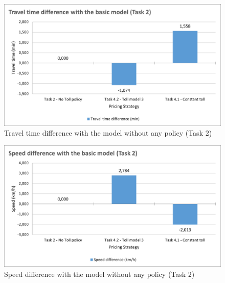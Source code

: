 \documentclass[a4paper, 12pt,oneside]{article}
\begin{document}
\begin{minipage}[c]{0.5\textwidth}
\begin{figure}[H]
    \centering
    \includegraphics[width=1\textwidth]{Images/Step4/TravelTime.png}
    \caption{Travel time difference with the model without any policy (Task 2)}
    \label{fig:Travel time difference with the model without any policy (Task 2)}
\end{figure}
\end{minipage}
\begin{minipage}[c]{0.5\textwidth}
\begin{figure}[H]
    \centering
    \includegraphics[width=1\textwidth]{Images/Step4/Speed.png}
    \caption{Speed difference with the model without any policy (Task 2)}
    \label{fig:Speed difference with the model without any policy (Task 2)}
\end{figure}
\end{minipage}
\end{document}
